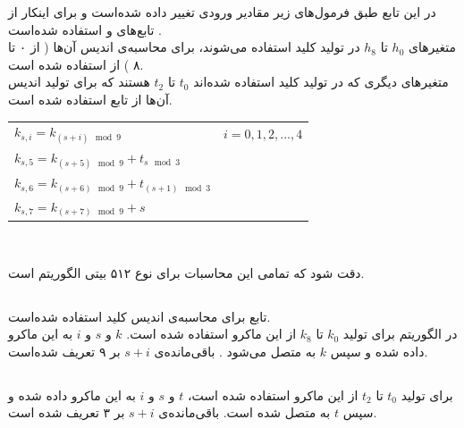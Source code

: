 در این تابع طبق فرمول‌های زیر مقادیر ورودی تغییر داده شده‌است و برای اینکار از تابع‌های \hyperref[subsec:SKBI]{} و \hyperref[subsec:SKBT]{} استفاده شده‌است .
\\متغیرهای $ h_0 $ تا $ h_8 $ در تولید کلید استفاده می‌شوند، برای محاسبه‌ی اندیس آن‌ها ( از ۰ تا ۸ ) از  استفاده شده است.
\\
متغیر‌های دیگری که در تولید کلید استفاده شده‌اند $ t_0 $ تا $ t_2 $ هستند که برای تولید اندیس آن‌ها از تابع  استفاده شده است.\\
\begin{latin}
	\begin{center}
		\begin{tabular}{l l}
			$k_{s, i} = k_{(s+i) \mod 9} $ \hspace{15mm} & $  i = 0, 1, 2, ... , 4 $ \\
			$k_{s, 5} = k_{(s+5) \mod 9} + t_{s \mod 3}$ & \\
			$k_{s, 6} = k_{(s+6) \mod 9} + t_{(s+1) \mod 3}$ & \\
			$k_{s, 7} = k_{(s+7) \mod 9} + s $ & \\

		\end{tabular}
		\\

	\end{center}
\end{latin}

دقت شود که تمامی این محاسبات برای نوع ۵۱۲ بیتی الگوریتم است.




\subsection{}
\label{subsec:SKBI}

تابع  برای محاسبه‌ی اندیس کلید استفاده‌ شده‌است. \\
در الگوریتم برای تولید $k_0 $ تا $ k_8 $ از این ماکرو استفاده شده ‌است. $ k $ و $ s $ و $ i $ به این ماکرو داده ‌شده‌ و سپس $ k $ به متصل می‌شود .  باقی‌مانده‌ی ‌$s + i $ بر ۹ تعریف شده‌است.


\subsection{}
\label{subsec:SKBT}
برای تولید $ t_0 $ تا $ t_2 $ از این ماکرو استفاده شده است، $ t $ و $ s $ و ‌$ i $ به این ماکرو داده شده و سپس $ t $ به  متصل شده است.   باقی‌مانده‌ی $ s + i $ بر ۳ تعریف شده است.

